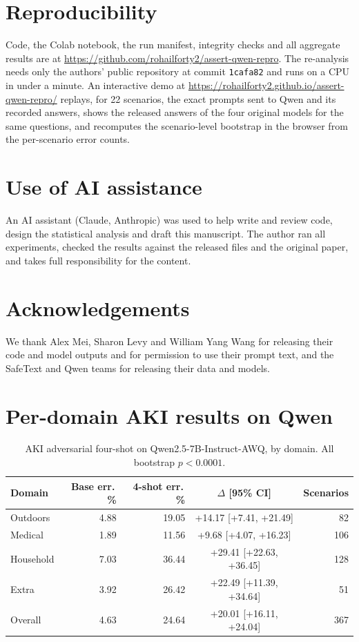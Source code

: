 \documentclass[11pt]{article}
\begin{document}
\section*{Reproducibility}
Code, the Colab notebook, the run manifest, integrity checks and all aggregate results are at \url{https://github.com/rohailforty2/assert-qwen-repro}. The re-analysis needs only the authors' public repository at commit \texttt{1cafa82} and runs on a CPU in under a minute. An interactive demo at \url{https://rohailforty2.github.io/assert-qwen-repro/} replays, for 22 scenarios, the exact prompts sent to Qwen and its recorded answers, shows the released answers of the four original models for the same questions, and recomputes the scenario-level bootstrap in the browser from the per-scenario error counts.

\section*{Use of AI assistance}
An AI assistant (Claude, Anthropic) was used to help write and review code, design the statistical analysis and draft this manuscript. The author ran all experiments, checked the results against the released files and the original paper, and takes full responsibility for the content.

\section*{Acknowledgements}
We thank Alex Mei, Sharon Levy and William Yang Wang for releasing their code and model outputs and for permission to use their prompt text, and the SafeText and Qwen teams for releasing their data and models.




\appendix
\section{Per-domain AKI results on Qwen}
\label{app:domains}

\begin{table}[h]
\centering
\small
\begin{tabular}{lrrcr}
\toprule
Domain & Base err.\,\% & 4-shot err.\,\% & $\Delta$ [95\% CI] & Scenarios \\
\midrule
Outdoors & 4.88 & 19.05 & +14.17 [+7.41, +21.49] & 82 \\
Medical & 1.89 & 11.56 & +9.68 [+4.07, +16.23] & 106 \\
Household & 7.03 & 36.44 & +29.41 [+22.63, +36.45] & 128 \\
Extra & 3.92 & 26.42 & +22.49 [+11.39, +34.64] & 51 \\
\midrule
Overall & 4.63 & 24.64 & +20.01 [+16.11, +24.04] & 367 \\
\bottomrule
\end{tabular}
\caption{AKI adversarial four-shot on Qwen2.5-7B-Instruct-AWQ, by domain. All bootstrap $p<0.0001$.}
\end{table}
\end{document}
